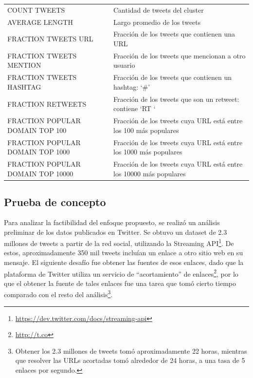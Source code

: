 \documentclass[11pt,letterpaper]{article}
\begin{document}
\begin{longtable}{|l|l|}
\hline
\hline
 COUNT TWEETS                       &  Cantidad de tweets del cluster                                            \\
 AVERAGE LENGTH                     &  Largo promedio de los tweets                                              \\
 FRACTION TWEETS URL                &  Fracción de los tweets que contienen una URL                              \\
 FRACTION TWEETS MENTION            &  Fracción de los tweets que mencionan a otro usuario                       \\
 FRACTION TWEETS HASHTAG            &  Fracción de los tweets que contienen un hashtag: `\#'                     \\
 FRACTION RETWEETS                  &  Fracción de los tweets que son un retweet: contiene `RT `                 \\
 FRACTION POPULAR DOMAIN TOP 100    &  Fracción de los tweets cuya URL está entre los 100 más populares          \\
 FRACTION POPULAR DOMAIN TOP 1000   &  Fracción de los tweets cuya URL está entre los 1000 más populares         \\
 FRACTION POPULAR DOMAIN TOP 10000  &  Fracción de los tweets cuya URL está entre los 10000 más populares        \\
\hline
\end{longtable}


   \endgroup

\subsection{Prueba de concepto}
\label{sec-3.2}


   Para analizar la factibilidad del enfoque propuesto, se realizó un
   análisis preliminar de los datos publicados en Twitter. Se obtuvo
   un dataset de 2.3 millones de tweets a partir de la red 
   social, utilizando la Streaming
   API\footnote{\href{https://dev.twitter.com/docs/streaming-api}{https://dev.twitter.com/docs/streaming-api} }. De estos,
   aproximadamente 350 mil tweets incluían un enlace a otro sitio web
   en su mensaje. El siguiente desafío fue obtener las fuentes de esos
   enlaces, dado que la plataforma de Twitter utiliza un servicio de
   ``acortamiento'' de enlaces\footnote{\href{http://t.co}{http://t.co} }, por lo que el obtener
   la fuente de tales enlaces fue una tarea que tomó cierto tiempo
   comparado con el resto del análisis\footnote{Obtener los 2.3 millones de
   tweets tomó aproximadamente 22 horas, mientras que resolver las
   URLs acortadas tomó alrededor de 24 horas, a una tasa de 5 enlaces
   por segundo. }.
\end{document}
